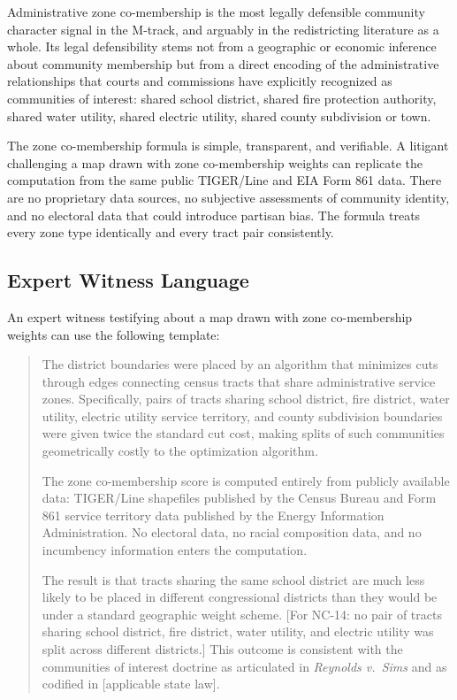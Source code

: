 \label{sec:conclusion}

Administrative zone co-membership is the most legally defensible community character
signal in the M-track, and arguably in the redistricting literature as a whole.
Its legal defensibility stems not from a geographic or economic inference about
community membership but from a direct encoding of the administrative relationships
that courts and commissions have explicitly recognized as communities of interest:
shared school district, shared fire protection authority, shared water utility,
shared electric utility, shared county subdivision or town.

The zone co-membership formula is simple, transparent, and verifiable.
A litigant challenging a map drawn with zone co-membership weights can replicate the
computation from the same public TIGER/Line and EIA Form 861 data.
There are no proprietary data sources, no subjective assessments of community identity,
and no electoral data that could introduce partisan bias.
The formula treats every zone type identically and every tract pair consistently.

\subsection{Expert Witness Language}

An expert witness testifying about a map drawn with zone co-membership weights can
use the following template:
\begin{quote}
  The district boundaries were placed by an algorithm that minimizes cuts through
  edges connecting census tracts that share administrative service zones.
  Specifically, pairs of tracts sharing school district, fire district, water utility,
  electric utility service territory, and county subdivision boundaries were given
  twice the standard cut cost, making splits of such communities geometrically
  costly to the optimization algorithm.

  The zone co-membership score is computed entirely from publicly available data:
  TIGER/Line shapefiles published by the Census Bureau and Form 861 service territory
  data published by the Energy Information Administration.
  No electoral data, no racial composition data, and no incumbency information enters
  the computation.

  The result is that tracts sharing the same school district are much less likely to
  be placed in different congressional districts than they would be under a standard
  geographic weight scheme.
  [For NC-14: no pair of tracts sharing school district, fire district, water utility,
  and electric utility was split across different districts.]
  This outcome is consistent with the communities of interest doctrine as articulated
  in \textit{Reynolds v.\ Sims} and as codified in [applicable state law].
\end{quote}

